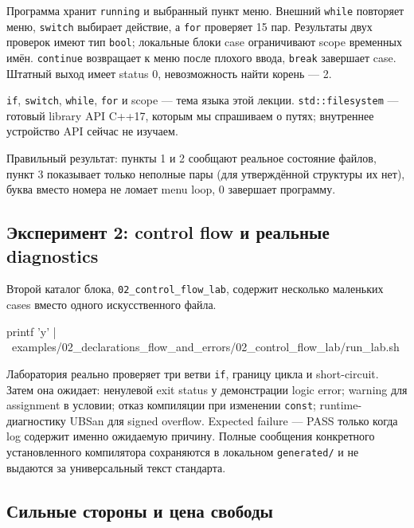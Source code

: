 Программа хранит \texttt{running} и выбранный пункт меню. Внешний
\texttt{while} повторяет меню, \texttt{switch} выбирает действие, а
\texttt{for} проверяет 15 пар. Результаты двух проверок имеют тип
\texttt{bool}; локальные блоки case
ограничивают scope временных имён. \texttt{continue} возвращает к меню после
плохого ввода, \texttt{break} завершает case. Штатный выход имеет status 0,
невозможность найти корень --- 2.

\begin{standardbox}
\texttt{if}, \texttt{switch}, \texttt{while}, \texttt{for} и scope --- тема
языка этой лекции. \texttt{std::filesystem} --- готовый library API C++17,
которым мы спрашиваем о путях; внутреннее устройство API сейчас не изучаем.
\end{standardbox}

Правильный результат: пункты 1 и 2 сообщают реальное состояние файлов, пункт
3 показывает только неполные пары (для утверждённой структуры их нет), буква
вместо номера не ломает menu loop, 0 завершает программу.

\subsection{Эксперимент 2: control flow и реальные diagnostics}

Второй каталог блока, \texttt{02\_control\_flow\_lab}, содержит несколько
маленьких cases вместо одного искусственного файла.

\begin{shellcode}
printf 'y\n' | \
  examples/02_declarations_flow_and_errors/02_control_flow_lab/run_lab.sh
\end{shellcode}

Лаборатория реально проверяет три ветви \texttt{if}, границу цикла и
short-circuit. Затем она ожидает: ненулевой exit status у демонстрации logic
error; warning для assignment в условии; отказ компиляции при изменении
\texttt{const}; runtime-диагностику UBSan для signed overflow. Expected failure
--- PASS только когда log содержит именно ожидаемую причину. Полные сообщения
конкретного установленного компилятора сохраняются в локальном
\texttt{generated/} и не выдаются за универсальный текст стандарта.

\subsection{Сильные стороны и цена свободы}

